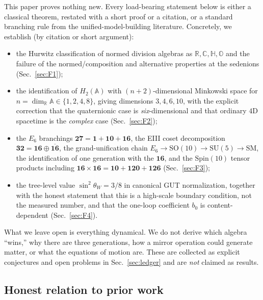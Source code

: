 \documentclass[aps,prresearch,onecolumn,amsmath,amssymb,nofootinbib]{revtex4-2}
\theoremstyle{plain}\newtheorem{theorem}{Theorem}[section]\newtheorem{proposition}[theorem]{Proposition}\newtheorem{lemma}[theorem]{Lemma}\newtheorem{corollary}[theorem]{Corollary}
\theoremstyle{definition}\newtheorem{definition}[theorem]{Definition}\newtheorem{conjecture}[theorem]{Conjecture}
\theoremstyle{remark}\newtheorem{remark}[theorem]{Remark}
\begin{document}
This paper proves nothing new. Every load-bearing statement below is either a classical theorem, restated with a short proof or a citation, or a standard branching rule from the unified-model-building literature. Concretely, we establish (by citation or short argument):
\begin{itemize}
\item the Hurwitz classification of normed division algebras as $\mathbb{R},\mathbb{C},\mathbb{H},\mathbb{O}$ and the failure of the normed/composition and alternative properties at the sedenions (Sec.~\ref{sec:F1});
\item the identification of $H_2(\mathbb{A})$ with $(n+2)$-dimensional Minkowski space for $n=\dim_\mathbb{R}\mathbb{A}\in\{1,2,4,8\}$, giving dimensions $3,4,6,10$, with the explicit correction that the quaternionic case is \emph{six}-dimensional and that ordinary $4$D spacetime is the \emph{complex} case (Sec.~\ref{sec:F2});
\item the $E_6$ branchings $\mathbf{27}=\mathbf{1}+\mathbf{10}+\mathbf{16}$, the EIII coset decomposition $\mathbf{32}=\mathbf{16}\oplus\overline{\mathbf{16}}$, the grand-unification chain $E_6\to\mathrm{SO}(10)\to\mathrm{SU}(5)\to\mathrm{SM}$, the identification of one generation with the $\mathbf{16}$, and the $\mathrm{Spin}(10)$ tensor products including $\mathbf{16}\times\mathbf{16}=\mathbf{10}+\mathbf{120}+\mathbf{126}$ (Sec.~\ref{sec:F3});
\item the tree-level value $\sin^2\theta_W=3/8$ in canonical GUT normalization, together with the honest statement that this is a high-scale boundary condition, not the measured number, and that the one-loop coefficient $b_0$ is content-dependent (Sec.~\ref{sec:F4}).
\end{itemize}

What we leave open is everything dynamical. We do not derive which algebra ``wins,'' why there are three generations, how a mirror operation could generate matter, or what the equations of motion are. These are collected as explicit conjectures and open problems in Sec.~\ref{sec:ledger} and are \emph{not} claimed as results.

\subsection{Honest relation to prior work}
\end{document}
